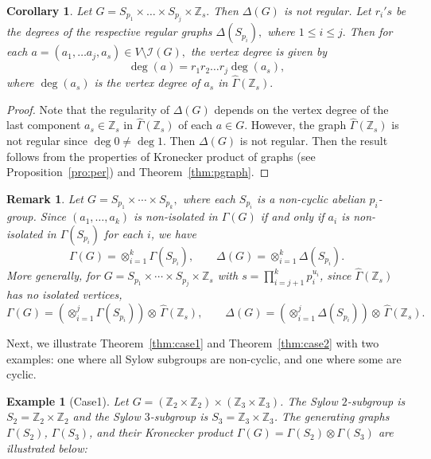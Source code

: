 \documentclass[11pt]{article}
\def \Z {{\mathbb Z}}
\def \I {{\mathcal I}}
\def \Ga {{\Gamma}}
\newtheorem{cor}[theorem]{Corollary}
\newtheorem{rem}[theorem]{Remark}
\newtheorem{ex}[theorem]{Example}
\begin{document}
\begin{cor}\label{cor:degz}
    Let $G=S_{p_1}\times  \ldots \times  S_{p_j}\times  \Z_s.$ Then $\Delta(G)$ is not regular. Let $r_i's$ be the degrees of the respective regular graphs $\Delta(S_{p_i}),$ where $1\leq i \leq j. $ Then for each $a=(a_1,\dots a_j,a_s)\in V\setminus\I(G),$ the vertex degree is given by
    $$\deg(a)=r_1r_2\ldots r_j\deg(a_s),$$ where $\deg(a_s)$ is the vertex degree of $a_s$  in $\widehat \Ga(\Z_s).$
\end{cor}
\begin{proof}
    Note that the regularity of $\Delta(G)$ depends on the vertex degree of the last component $a_s\in \Z_s$ in $\widehat\Ga(\Z_s)$ of each $a\in G.$ However, the graph $\widehat \Ga(\Z_s)$ is not regular since $\deg 0\neq \deg 1.$ Then $\Delta(G)$ is not regular. Then the result follows from the properties of Kronecker product of graphs (see Proposition~\ref{pro:per}) and Theorem~\ref{thm:pgraph}.
\end{proof}
\begin{rem}\label{rem:decompose}
        Let $G = S_{p_1}\times\cdots\times S_{p_k},$ where each $S_{p_i}$ is 
        a non-cyclic abelian $p_i$-group. Since $(a_1,\ldots,a_k)$ is 
        non-isolated in $\Gamma(G)$ if and only if $a_i$ is non-isolated in 
        $\Gamma(S_{p_i})$ for each $i$, we have
        $$\Gamma(G) = \otimes_{i=1}^{k}\Gamma(S_{p_i}), \qquad 
        \Delta(G) = \otimes_{i=1}^{k}\Delta(S_{p_i}).$$
        More generally, for $G = S_{p_1}\times\cdots\times S_{p_j}\times 
        \mathbb{Z}_s$ with $s = \prod\limits_{i=j+1}^{k}p_i^{u_i}$, since 
        $\widehat{\Gamma}(\mathbb{Z}_s)$ has no isolated vertices,
        $$\Gamma(G) = \left(\otimes_{i=1}^{j}\Gamma(S_{p_i})\right)
        \otimes\,\widehat{\Gamma}(\mathbb{Z}_s), \qquad \Delta(G) = 
        \left(\otimes_{i=1}^{j}\Delta(S_{p_i})\right)\otimes\,
        \widehat{\Gamma}(\mathbb{Z}_s).$$
\end{rem}

Next, we illustrate Theorem~\ref{thm:case1} and Theorem~\ref{thm:case2} with two examples: one where all 
Sylow subgroups are non-cyclic, and one where some are cyclic.
\begin{ex}[Case1]
    Let $G = (\mathbb{Z}_2 \times \mathbb{Z}_2) \times (\mathbb{Z}_3 \times 
    \mathbb{Z}_3)$. The Sylow $2$-subgroup is $S_2 = \mathbb{Z}_2 \times 
    \mathbb{Z}_2$ and the Sylow $3$-subgroup is $S_3 = \mathbb{Z}_3 \times 
    \mathbb{Z}_3$. The generating graphs $\Gamma(S_2)$, $\Gamma(S_3)$, and 
    their Kronecker product $\Gamma(G) = \Gamma(S_2) \otimes \Gamma(S_3)$ 
    are illustrated below:
\end{ex}
\end{document}
